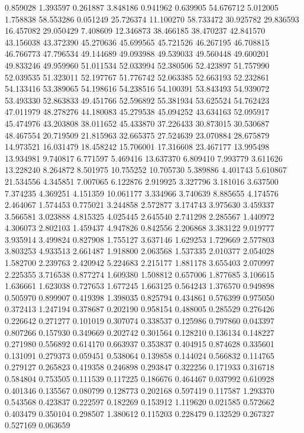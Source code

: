 0.859028
1.393597
0.261887
3.848186
0.941962
0.639905
54.676712
5.012005
1.758838
58.553286
0.051249
25.726374
11.100270
58.733472
30.925782
29.836593
16.457082
29.050429
7.408609
12.346873
38.466185
38.470237
42.841570
43.156038
43.372390
45.270636
45.699565
45.721526
46.267195
46.708815
46.766773
47.796534
49.144689
49.093988
49.539033
49.560448
49.600201
49.833246
49.959960
51.011534
52.033994
52.380506
52.423897
51.757990
52.039535
51.323011
52.197767
51.776742
52.063385
52.663193
52.232861
54.133416
53.389065
54.198616
54.238516
54.100391
53.843493
54.939072
53.493330
52.863833
49.451766
52.596892
55.381934
53.625524
54.762423
47.011979
48.278276
44.180083
45.279538
45.094252
43.634163
52.095917
45.474976
43.203808
38.011652
45.433870
37.226433
30.873015
30.530687
48.467554
20.719509
21.815963
32.665375
27.524639
23.070884
28.675879
14.973521
16.031479
18.458242
15.706001
17.316608
23.467177
13.995498
13.934981
9.740817
6.771597
5.469416
13.637370
6.809410
7.993779
3.611626
13.228240
8.264872
8.501975
10.755252
10.705730
5.389886
4.401743
5.610867
21.534556
4.345851
7.007065
6.122876
2.919925
3.327796
3.181016
3.637500
7.374235
4.369251
4.151359
10.061177
3.334966
3.740639
8.885655
4.174576
2.464067
1.574453
0.775021
3.244858
2.572877
3.174743
3.975630
3.459337
3.566581
3.023888
4.815325
4.025445
2.645540
2.741298
2.285567
1.440972
4.306073
2.802103
1.459437
4.947826
0.842556
2.206868
3.383122
9.019777
3.935914
3.499824
0.827908
1.755127
3.637146
1.629253
1.729669
2.577803
3.803253
4.933513
2.661487
1.918800
2.063568
1.537335
2.010377
2.054028
1.582700
2.239763
2.420942
5.224683
2.215177
1.881178
3.655403
2.070997
2.225355
3.716538
0.877274
1.609380
1.508812
0.657006
1.877685
3.106615
1.636661
1.623038
0.727653
1.677245
1.663125
0.564243
1.376570
0.949898
0.505970
0.899907
0.419398
1.398035
0.825794
0.434861
0.576399
0.975050
0.372413
1.247194
0.378687
0.202190
0.958154
0.488005
0.285529
0.276426
0.226642
0.271277
0.101019
0.307074
0.338537
0.125986
0.797860
0.043397
0.807266
0.157930
0.349669
0.202742
0.301564
0.128210
0.136134
0.148227
0.271980
0.556892
0.614170
0.663937
0.353837
0.404915
0.874628
0.335601
0.131091
0.279373
0.059451
0.538064
0.139858
0.144024
0.566832
0.114765
0.279127
0.265823
0.419358
0.246898
0.293847
0.322256
0.171933
0.316718
0.584804
0.753505
0.111539
0.117225
0.186676
0.464467
0.037992
0.610928
0.401346
0.135567
0.080799
0.128773
0.202168
0.597419
0.117587
1.293370
0.543568
0.423837
0.222597
0.182269
0.153912
1.119620
0.021585
0.572662
0.403479
0.350104
0.298507
1.380612
0.115203
0.228479
0.132529
0.267327
0.527169
0.063659
